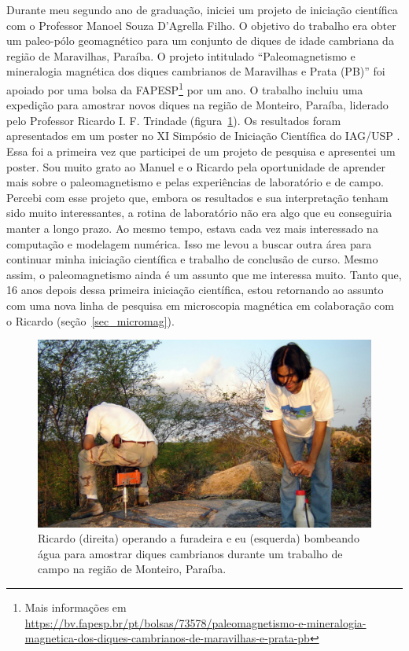 \documentclass[10pt,a4paper,oneside]{book}
\begin{document}
Durante meu segundo ano de graduação, iniciei um projeto de iniciação
científica com o Professor Manoel Souza D'Agrella Filho.
O objetivo do trabalho era obter um paleo-pólo geomagnético para um conjunto
de diques de idade cambriana da região de Maravilhas, Paraíba.
O projeto intitulado ``Paleomagnetismo e mineralogia magnética dos diques
cambrianos de Maravilhas e Prata (PB)'' foi apoiado por uma bolsa da
FAPESP\footnote{Mais informações em
\url{https://bv.fapesp.br/pt/bolsas/73578/paleomagnetismo-e-mineralogia-magnetica-dos-diques-cambrianos-de-maravilhas-e-prata-pb}}
por um ano.
O trabalho incluiu uma expedição para amostrar novos diques na região de
Monteiro, Paraíba, liderado pelo Professor Ricardo I. F. Trindade
(figura~\ref{fig_paleomag}).
Os resultados foram apresentados em um poster no XI Simpósio de Iniciação
Científica do IAG/USP \citep{Uieda2006}.
Essa foi a primeira vez que participei de um projeto de pesquisa e apresentei
um poster.
Sou muito grato ao Manuel e o Ricardo pela oportunidade de aprender mais sobre
o paleomagnetismo e pelas experiências de laboratório e de campo.
Percebi com esse projeto que, embora os resultados e sua interpretação tenham
sido muito interessantes, a rotina de laboratório não era algo que eu
conseguiria manter a longo prazo.
Ao mesmo tempo, estava cada vez mais interessado na computação e modelagem
numérica.
Isso me levou a buscar outra área para continuar minha iniciação científica e
trabalho de conclusão de curso.
Mesmo assim, o paleomagnetismo ainda é um assunto que me interessa muito.
Tanto que, 16 anos depois dessa primeira iniciação científica, estou retornando
ao assunto com uma nova linha de pesquisa em microscopia magnética em
colaboração com o Ricardo (seção~\ref{sec_micromag}).

\begin{figure}[tb]
  \begin{center}
    \includegraphics[width=\textwidth]{images/campo-paleomag-2005.jpg}
  \end{center}
  \caption{
    Ricardo (direita) operando a furadeira e eu (esquerda) bombeando água para
    amostrar diques cambrianos durante um trabalho de campo na região de
    Monteiro, Paraíba.
  }
  \label{fig_paleomag}
\end{figure}
\end{document}
